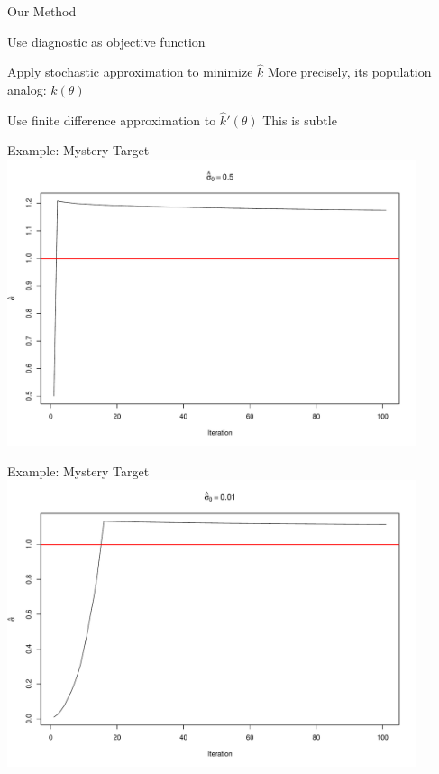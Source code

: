 \documentclass[14pt]{beamer}
\begin{document}
\begin{frame}{Our Method}
    \begin{outline}
        \1 Use diagnostic as objective function \newline

        \1 Apply stochastic approximation to minimize $\hat{k}$
            \2 More precisely, its population analog: $k(\theta)$ \newline

        \1 Use finite difference approximation to $\hat{k}'(\theta)$
            \2 This is subtle
    \end{outline}
\end{frame}

\begin{frame}{Example: Mystery Target}
    \centering
    \includegraphics[height=0.9\textheight, width=0.9\textwidth, keepaspectratio]{Figures/k_hat Traj - 0,5.pdf}
\end{frame}

\begin{frame}{Example: Mystery Target}
    \centering
    \includegraphics[height=0.9\textheight, width=0.9\textwidth, keepaspectratio]{Figures/k_hat Traj - 0,01.pdf}
\end{frame}
\end{document}
